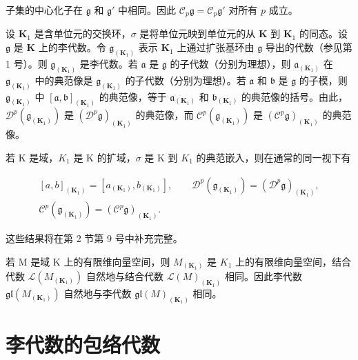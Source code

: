 子集的中心化子在 \(\mathfrak{g}\) 和 \(\mathfrak{g}'\) 中相同。因此 \(\mathcal{C}_p\mathfrak{g} = \mathcal{C}_p\mathfrak{g}'\) 对所有 \(p\) 成立。

设 \(\mathbf{K}_1\) 是含单位元的交换环，\(\sigma\) 是将单位元映到单位元的从 \(\mathbf{K}\) 到 \(\mathbf{K}_1\) 的同态。设 \(\mathfrak{g}\) 是 \(\mathbf{K}\) 上的李代数。令 \(\mathfrak{g}_{(\mathbf{K}_1)}\) 表示 \(\mathbf{K}_1\) 上通过扩张基环由 \(\mathfrak{g}\) 导出的代数（参见第 1 号）。则 \(\mathfrak{g}_{(\mathbf{K}_1)}\) 是李代数。若 \(\mathfrak{a}\) 是 \(\mathfrak{g}\) 的子代数（分别为理想），则 \(\mathfrak{a}_{(\mathbf{K}_1)}\) 在 \(\mathfrak{g}_{(\mathbf{K}_1)}\) 中的典范像是 \(\mathfrak{g}_{(\mathbf{K}_1)}\) 的子代数（分别为理想）。若 \(\mathfrak{a}\) 和 \(\mathfrak{b}\) 是 \(\mathfrak{g}\) 的子模，则 \(\mathfrak{g}_{(\mathbf{K}_1)}\) 中 \([\mathfrak{a},\mathfrak{b}]_{(\mathbf{K}_1)}\) 的典范像，等于 \(\mathfrak{a}_{(\mathbf{K}_1)}\) 和 \(\mathfrak{b}_{(\mathbf{K}_1)}\) 的典范像的括号。由此，\(\mathcal{D}^p (\mathfrak{g}_{(\mathbf{K}_1)})\) 是 \((\mathcal{D}^p\mathfrak{g})_{(\mathbf{K}_1)}\) 的典范像，而 \(\mathcal{C}^p (\mathfrak{g}_{(\mathbf{K}_1)})\) 是 \((\mathcal{C}^p\mathfrak{g})_{(\mathbf{K}_1)}\) 的典范像。

若 K 是域，\(K_{1}\) 是 K 的扩域，\(\sigma\) 是 K 到 \(K_{1}\) 的典范嵌入，则在通常的同一视下有

\[
\begin{array}{c} [ a, b ] _ {(\mathbf {K} _ {1})} = [ a _ {(\mathbf {K} _ {1})}, b _ {(\mathbf {K} _ {1})} ], \qquad \mathcal {D} ^ {p} (\mathfrak {g} _ {(\mathbf {K} _ {1})}) = (\mathcal {D} ^ {p} \mathfrak {g}) _ {(\mathbf {K} _ {1})}, \\ \mathcal {C} ^ {p} (\mathfrak {g} _ {(\mathbf {K} _ {1})}) = (\mathcal {C} ^ {p} \mathfrak {g}) _ {(\mathbf {K} _ {1})}. \end{array}
\]

这些结果将在第 2 节第 9 号中补充完整。

若 M 是域 K 上的有限维向量空间，则 \(M_{(\mathbf{K}_{1})}\) 是 \(K_{1}\) 上的有限维向量空间，结合代数 \(\mathcal{L}(M_{(\mathbf{K}_{1})})\) 自然地与结合代数 \(\mathcal{L}(M)_{(\mathbf{K}_{1})}\) 相同。因此李代数 \(\mathfrak{gl}(M_{(\mathbf{K}_{1})})\) 自然地与李代数 \(\mathfrak{gl}(M)_{(\mathbf{K}_{1})}\) 相同。

\section{李代数的包络代数}

